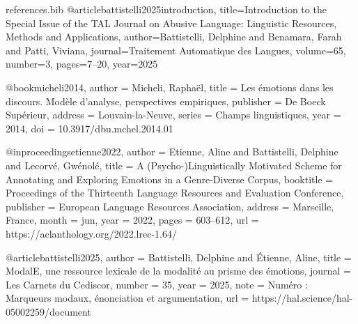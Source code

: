 \begin{filecontents*}{references.bib}
@article{battistelli2025introduction,
  title={Introduction to the Special Issue of the TAL Journal on Abusive Language: Linguistic Resources, Methods and Applications},
  author={Battistelli, Delphine and Benamara, Farah and Patti, Viviana},
  journal={Traitement Automatique des Langues},
  volume={65},
  number={3},
  pages={7--20},
  year={2025}
}

@book{micheli2014,
  author    = {Micheli, Rapha{\"e}l},
  title     = {Les {\'e}motions dans les discours. Mod{\`e}le d'analyse, perspectives empiriques},
  publisher = {De Boeck Sup{\'e}rieur},
  address   = {Louvain-la-Neuve},
  series    = {Champs linguistiques},
  year      = {2014},
  doi       = {10.3917/dbu.mchel.2014.01}
}

@inproceedings{etienne2022,
  author    = {Etienne, Aline and Battistelli, Delphine and Lecorv{\'e}, Gw{\'e}nol{\'e}},
  title     = {A ({P}sycho-){L}inguistically Motivated Scheme for Annotating and Exploring Emotions in a Genre-Diverse Corpus},
  booktitle = {Proceedings of the Thirteenth Language Resources and Evaluation Conference},
  publisher = {European Language Resources Association},
  address   = {Marseille, France},
  month     = jun,
  year      = {2022},
  pages     = {603--612},
  url       = {https://aclanthology.org/2022.lrec-1.64/}
}

@article{battistelli2025,
  author  = {Battistelli, Delphine and {\'E}tienne, Aline},
  title   = {{ModalE}, une ressource lexicale de la modalit{\'e} au prisme des {\'e}motions},
  journal = {Les Carnets du Cediscor},
  number  = {35},
  year    = {2025},
  note    = {Num{\'e}ro : Marqueurs modaux, {\'e}nonciation et argumentation},
  url     = {https://hal.science/hal-05002259/document}
}
\end{filecontents*}

\documentclass{stageOnera}
%

\usepackage[utf8]{inputenc}
\usepackage[T1]{fontenc}
\usepackage{csquotes}
\usepackage{url}
\usepackage{xcolor}
\usepackage[
  colorlinks=true,
  linkcolor=linkblue,
  citecolor=linkblue,
  urlcolor=linkblue
]{hyperref}
\usepackage[numbers]{natbib}
\usepackage[french]{babel}
\usepackage{booktabs}
\usepackage{amsmath}
\usepackage{placeins}

%




